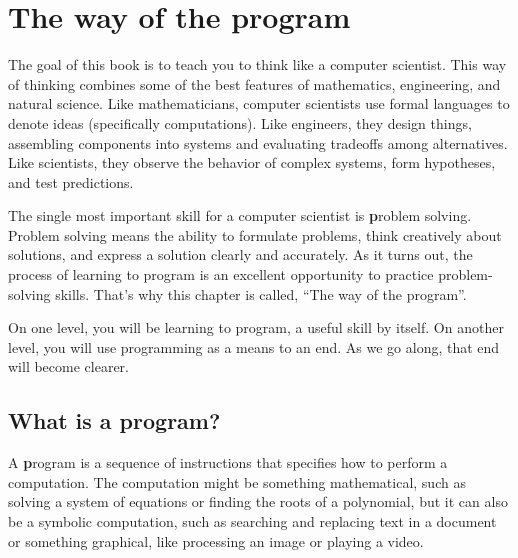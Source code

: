 \documentclass[
DIV=11,
fontsize=13,
twoside,
headinclude=false,
titlepage=firstiscover,
abstract=true,
headsepline=true,
footsepline=true,
chapterprefix=true, %
headings=big,
bibliography=totoc,%
captions=tableheading
]{scrbook}
\theoremstyle{definition}
\begin{document}
\normalsize
\clearemptydoublepage

\begin{latexonly}

\tableofcontents

\clearemptydoublepage

\end{latexonly}

\mainmatter

\chapter{The way of the program}

The goal of this book is to teach you to think like a computer
scientist.  This way of thinking combines some of the best features of
mathematics, engineering, and natural science.  Like mathematicians,
computer scientists use formal languages to denote ideas (specifically
computations).  Like engineers, they design things, assembling
components into systems and evaluating tradeoffs among alternatives.
Like scientists, they observe the behavior of complex systems, form
hypotheses, and test predictions.  

The single most important skill for a computer scientist is {\textbf
  problem solving}.  Problem solving means the ability to formulate
problems, think creatively about solutions, and express a solution
clearly and accurately.  As it turns out, the process of learning to
program is an excellent opportunity to practice problem-solving
skills.  That's why this chapter is called, ``The way of the
program''.

On one level, you will be learning to program, a useful skill by
itself.  On another level, you will use programming as a means to an
end.  As we go along, that end will become clearer.


\section{What is a program?}

A {\textbf program} is a sequence of instructions that specifies how to
perform a computation.  The computation might be something
mathematical, such as solving a system of equations or finding the
roots of a polynomial, but it can also be a symbolic computation, such
as searching and replacing text in a document or something
graphical, like processing an image or playing a video.
\end{document}
